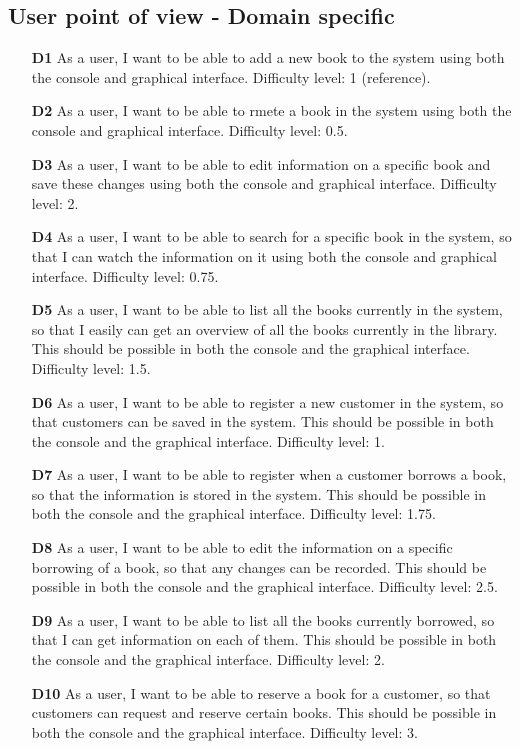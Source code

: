 \subsection*{User point of view - Domain specific}
\begin{itemize}
  \item [\textbf{D1}] As a user, I want to be able to add a new book to the system using both the console and graphical interface. Difficulty level: 1 (reference).
  \item [\textbf{D2}] As a user, I want to be able to rmete a book in the system using both the console and graphical interface. Difficulty level: 0.5.
  \item [\textbf{D3}] As a user, I want to be able to edit information on a specific book and save these changes using both the console and graphical interface. Difficulty level: 2.
  \item [\textbf{D4}] As a user, I want to be able to search for a specific book in the system, so that I can watch the information on it using both the console and graphical interface. Difficulty level: 0.75.
  \item [\textbf{D5}] As a user, I want to be able to list all the books currently in the system, so that I easily can get an overview of all the books currently in the library. This should be possible in both the console and the graphical interface. Difficulty level: 1.5.
  \item [\textbf{D6}] As a user, I want to be able to register a new customer in the system, so that customers can be saved in the system. This should be possible in both the console and the graphical interface. Difficulty level: 1.
  \item [\textbf{D7}] As a user, I want to be able to register when a customer borrows a book, so that the information is stored in the system. This should be possible in both the console and the graphical interface. Difficulty level: 1.75.
  \item [\textbf{D8}] As a user, I want to be able to edit the information on a specific borrowing of a book, so that any changes can be recorded. This should be possible in both the console and the graphical interface. Difficulty level: 2.5.
  \item [\textbf{D9}] As a user, I want to be able to list all the books currently borrowed, so that I can get information on each of them. This should be possible in both the console and the graphical interface. Difficulty level: 2.
  \item [\textbf{D10}] As a user, I want to be able to reserve a book for a customer, so that customers can request and reserve certain books. This should be possible in both the console and the graphical interface. Difficulty level: 3.

\end{itemize}
